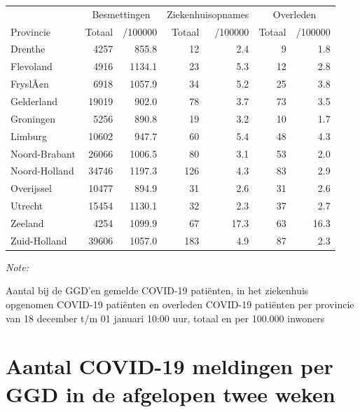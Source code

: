 \documentclass[
  english,
  man,floatsintext]{apa6}
\begin{document}
\begin{table}
\centering
\begin{threeparttable}
\begin{tabular}{lrrrrrr}
\toprule
\multicolumn{1}{c}{ } & \multicolumn{2}{c}{Besmettingen} & \multicolumn{2}{c}{Ziekenhuisopnames} & \multicolumn{2}{c}{Overleden} \\
\cmidrule(l{3pt}r{3pt}){2-3} \cmidrule(l{3pt}r{3pt}){4-5} \cmidrule(l{3pt}r{3pt}){6-7}
Provincie & Totaal & /100000 & Totaal & /100000 & Totaal & /100000\\
\midrule
Drenthe & 4257 & 855.8 & 12 & 2.4 & 9 & 1.8\\
Flevoland & 4916 & 1134.1 & 23 & 5.3 & 12 & 2.8\\
FryslÃ¢n & 6918 & 1057.9 & 34 & 5.2 & 25 & 3.8\\
Gelderland & 19019 & 902.0 & 78 & 3.7 & 73 & 3.5\\
Groningen & 5256 & 890.8 & 19 & 3.2 & 10 & 1.7\\
Limburg & 10602 & 947.7 & 60 & 5.4 & 48 & 4.3\\
Noord-Brabant & 26066 & 1006.5 & 80 & 3.1 & 53 & 2.0\\
Noord-Holland & 34746 & 1197.3 & 126 & 4.3 & 83 & 2.9\\
Overijssel & 10477 & 894.9 & 31 & 2.6 & 31 & 2.6\\
Utrecht & 15454 & 1130.1 & 32 & 2.3 & 37 & 2.7\\
Zeeland & 4254 & 1099.9 & 67 & 17.3 & 63 & 16.3\\
Zuid-Holland & 39606 & 1057.0 & 183 & 4.9 & 87 & 2.3\\
\bottomrule
\end{tabular}
\begin{tablenotes}
\item \textit{Note: } 
\item Aantal bij de GGD’en gemelde COVID-19 patiënten, in het ziekenhuis opgenomen COVID-19 patiënten en overleden COVID-19 patiënten per provincie van 18 december t/m 01 januari 10:00 uur, totaal en per 100.000 inwoners
\end{tablenotes}
\end{threeparttable}
\end{table}

\newpage

\hypertarget{aantal-covid-19-meldingen-per-ggd-in-de-afgelopen-twee-weken}{%
\section{Aantal COVID-19 meldingen per GGD in de afgelopen twee weken}\label{aantal-covid-19-meldingen-per-ggd-in-de-afgelopen-twee-weken}}
\end{document}
